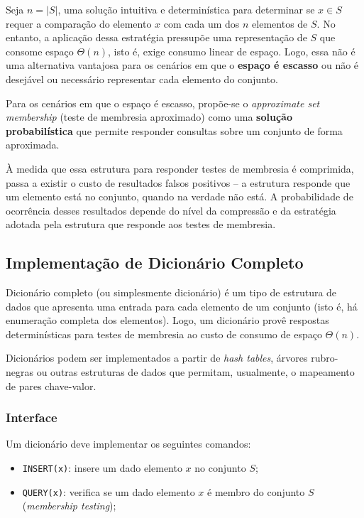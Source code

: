 \documentclass[12pt,twoside,english,brazilian]{article}
\begin{document}
Seja $n = |S|$, uma solução intuitiva e determinística para determinar se $x \in S$ requer a comparação do elemento $x$ com cada um dos $n$ elementos de $S$. No entanto, a aplicação dessa estratégia pressupõe uma representação de $S$ que consome espaço $\Theta(n)$, isto é, exige consumo linear de espaço. Logo, essa não é uma alternativa vantajosa para os cenários em que o \textbf{espaço é escasso} ou não é desejável ou necessário representar cada elemento do conjunto.

Para os cenários em que o espaço é escasso, propõe-se o \textit{approximate set membership} (teste de membresia aproximado) como uma \textbf{solução probabilística} que permite responder consultas sobre um conjunto de forma aproximada.

À medida que essa estrutura para responder testes de membresia é comprimida, passa a existir o custo de resultados falsos positivos -- a estrutura responde que um elemento está no conjunto, quando na verdade não está. A probabilidade de ocorrência desses resultados depende do nível da compressão e da estratégia adotada pela estrutura que responde aos testes de membresia.

\subsection{Implementação de Dicionário Completo}

Dicionário completo (ou simplesmente dicionário) é um tipo de estrutura de dados que apresenta uma entrada para cada elemento de um conjunto (isto é, há enumeração completa dos elementos). Logo, um dicionário provê respostas determinísticas para testes de membresia ao custo de consumo de espaço $\Theta(n)$.

Dicionários podem ser implementados a partir de \textit{hash tables}, árvores rubro-negras ou outras estruturas de dados que permitam, usualmente, o mapeamento de pares chave-valor.

\subsubsection{Interface}

Um dicionário deve implementar os seguintes comandos:
\begin{itemize}
    \item \texttt{INSERT(x)}: insere um dado elemento $x$ no conjunto $S$;
    \item \texttt{QUERY(x)}: verifica se um dado elemento $x$ é membro do conjunto $S$ (\textit{membership testing});
\end{itemize}
\end{document}
